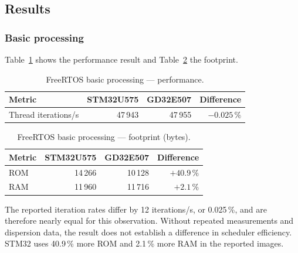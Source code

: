 \subsection{Results}
\label{sec:gd32-freertos-results}

\subsubsection{Basic processing}
\label{sec:gd32-freertos-basic}

Table~\ref{tab:gd32-freertos-basic-perf} shows the performance result and
Table~\ref{tab:gd32-freertos-basic-fp} the footprint.

\begin{table}[H]
  \centering
  \caption{FreeRTOS basic processing --- performance.}
  \label{tab:gd32-freertos-basic-perf}
  \begin{tabular}{l r r r}
    \toprule
    \textbf{Metric} & \textbf{STM32U575} & \textbf{GD32E507} & \textbf{Difference} \\
    \midrule
    Thread iterations/s & 47\,943 & 47\,955 & $-0.025\,\%$ \\
    \bottomrule
  \end{tabular}
\end{table}

\begin{table}[H]
  \centering
  \caption{FreeRTOS basic processing --- footprint (bytes).}
  \label{tab:gd32-freertos-basic-fp}
  \begin{tabular}{l r r r}
    \toprule
    \textbf{Metric} & \textbf{STM32U575} & \textbf{GD32E507} & \textbf{Difference} \\
    \midrule
    ROM & 14\,266 & 10\,128 & $+40.9\,\%$ \\
    RAM & 11\,960 & 11\,716 & $+2.1\,\%$ \\
    \bottomrule
  \end{tabular}
\end{table}

The reported iteration rates differ by 12 iterations/s, or 0.025\,\%, and are therefore
nearly equal for this observation. Without repeated measurements and dispersion data, the
result does not establish a difference in scheduler efficiency. STM32 uses 40.9\,\% more ROM
and 2.1\,\% more RAM in the reported images.

